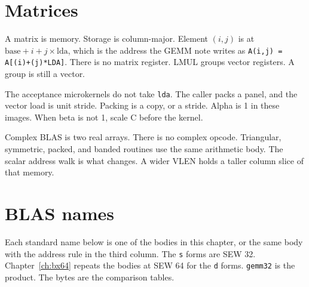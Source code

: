 

\section{Matrices}
\label{sec:blas}

A matrix is memory. Storage is column-major. Element $(i, j)$ is at $\mathrm{base} + i + j \times \mathrm{lda}$, which is the address the GEMM note writes as \texttt{A(i,j) = A[(i)+(j)*LDA]}. There is no matrix register. LMUL groups vector registers. A group is still a vector.

The acceptance microkernels do not take \texttt{lda}. The caller packs a panel, and the vector load is unit stride. Packing is a copy, or a stride. Alpha is 1 in these images. When beta is not 1, scale C before the kernel.

Complex BLAS is two real arrays. There is no complex opcode. Triangular, symmetric, packed, and banded routines use the same arithmetic body. The scalar address walk is what changes. A wider VLEN holds a taller column slice of that memory.

\section{BLAS names}

Each standard name below is one of the bodies in this chapter, or the same body with the address rule in the third column. The \texttt{s} forms are SEW 32. Chapter~\ref{ch:bx64} repeats the bodies at SEW 64 for the \texttt{d} forms. \texttt{gemm32} is the product. The bytes are the comparison tables.

